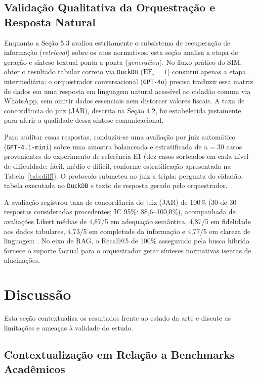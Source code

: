 \documentclass[12pt]{article}
\begin{document}
\subsection{Validação Qualitativa da Orquestração e Resposta Natural}

Enquanto a Seção 5.3 avaliou estritamente o subsistema de recuperação de informação (\textit{retrieval}) sobre os atos normativos, esta seção analisa a etapa de geração e síntese textual ponta a ponta (\textit{generation}). No fluxo prático do SIM, obter o resultado tabular correto via \texttt{DuckDB} ($\text{EF}_i = 1$) constitui apenas a etapa intermediária; o orquestrador conversacional (\texttt{GPT-4o}) precisa traduzir essa matriz de dados em uma resposta em linguagem natural acessível ao cidadão comum via WhatsApp, sem omitir dados essenciais nem distorcer valores fiscais. A taxa de concordância do juiz (JAR), descrita na Seção 4.2, foi estabelecida justamente para aferir a qualidade dessa síntese comunicacional.

Para auditar essas respostas, conduziu-se uma avaliação por juiz automático (\texttt{GPT-4.1-mini}) sobre uma amostra balanceada e estratificada de $n = 30$ casos provenientes do experimento de referência E1 (dez casos sorteados em cada nível de dificuldade: fácil, médio e difícil, conforme estratificação apresentada na Tabela~\ref{tab:diff}). O protocolo submeteu ao juiz a tripla: pergunta do cidadão, tabela executada no \texttt{DuckDB} e texto de resposta gerado pelo orquestrador.

A avaliação registrou taxa de concordância do juiz (JAR) de 100\% (30 de 30 respostas consideradas procedentes; IC 95\%: 88,6--100,0\%), acompanhada de avaliações Likert médias de 4,87/5 em adequação semântica, 4,87/5 em fidelidade aos dados tabulares, 4,73/5 em completude da informação e 4,77/5 em clareza de linguagem \cite{Zheng2023LLMJudge}. No eixo de RAG, o Recall@5 de 100\% assegurado pela busca híbrida fornece o suporte factual para o orquestrador gerar sínteses normativas isentas de alucinações.

\section{Discussão}
Esta seção contextualiza os resultados frente ao estado da arte e discute as limitações e ameaças à validade do estudo.

\subsection{Contextualização em Relação a Benchmarks Acadêmicos}
\end{document}
